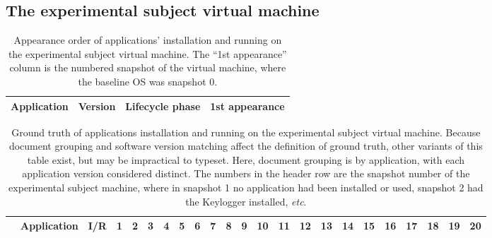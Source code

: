 \documentclass[11pt]{ucthesis}
\theoremstyle{plain}
\theoremstyle{definition}
\newcommand{\etc}{\emph{etc}\xspace}
\begin{document}
\subsection{The experimental subject virtual machine}
\label{sec:experimentvm}

\begin{table}[htp]
\caption{\label{tbl:evalvmapps:appearance_order_simple}Appearance order of applications' installation and running on the experimental subject virtual machine.  The ``1st appearance'' column is the numbered snapshot of the virtual machine, where the baseline OS was snapshot 0.}
\begin{center}
\begin{small}
  \begin{tabular}{p{}llr}
  \toprule
  Application & Version & Lifecycle phase & 1st appearance \\
  \midrule
  
  \bottomrule
  \end{tabular}
\end{small}
\end{center}
\end{table}

\begin{table}[htp]
\caption{\label{tbl:evalvmapps:app_distinct}Ground truth of applications installation and running on the experimental subject virtual machine.  Because document grouping and software version matching affect the definition of ground truth, other variants of this table exist, but may be impractical to typeset.  Here, document grouping is by application, with each application version considered distinct.  The numbers in the header row are the snapshot number of the experimental subject machine, where in snapshot 1 no application had been installed or used, snapshot 2 had the Keylogger installed, \etc.}
\begin{center}
\begin{small}
  \begin{tabular}{lp{18mm}lp{1.25mm}p{1.25mm}p{1.25mm}p{1.25mm}p{1.25mm}p{1.25mm}p{1.25mm}p{1.25mm}p{1.25mm}p{1.25mm}p{1.25mm}p{1.25mm}p{1.25mm}p{1.25mm}p{1.25mm}p{1.25mm}p{1.25mm}p{1.25mm}p{1.25mm}p{1.25mm}}
  \toprule
   & Application & I/R & 1 & 2 & 3 & 4 & 5 & 6 & 7 & 8 & 9 & 10 & 11 & 12 & 13 & 14 & 15 & 16 & 17 & 18 & 19 & 20 \\
  \midrule
  
  \bottomrule
  \end{tabular}
\end{small}
\end{center}
\end{table}
\end{document}
